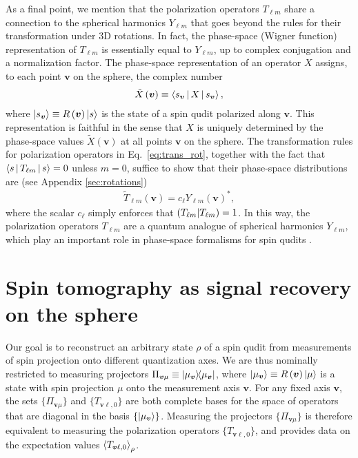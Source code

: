 \documentclass[notitlepage,twocolumn]{revtex4-2}
\newcommand{\p}[1]{\left(#1\right)} %
\newcommand{\bk}{\Braket} %
\renewcommand{\v}{\bm} %
\renewcommand{\set}[1]{\{#1\}} %
\def\obk#1{\mathinner{({#1})}}
\begin{document}
As a final point, we mention that the polarization operators $T_{\ell m}$ share a connection to the spherical harmonics $Y_{\ell m}$ that goes beyond the rules for their transformation under 3D rotations.
In fact, the phase-space (Wigner function) representation of $T_{\ell m}$ is essentially equal to $Y_{\ell m}$, up to complex conjugation and a normalization factor.
The phase-space representation of an operator $X$ assigns, to each point $\v v$ on the sphere, the complex number
\begin{align}
  \tilde X\p{\v v} \equiv \bk{s_{\v v}|X|s_{\v v}},
\end{align}
where $\ket{s_{\v v}}\equiv R\p{\v v}\ket{s}$ is the state of a spin qudit polarized along $\v v$.
This representation is faithful in the sense that $X$ is uniquely determined by the phase-space values $\tilde X\p{\v v}$ at all points $\v v$ on the sphere.
The transformation rules for polarization operators in Eq.~\eqref{eq:trans_rot}, together with the fact that $\bk{s|T_{\ell m}|s}=0$ unless $m=0$, suffice to show that their phase-space distributions are (see Appendix \ref{sec:rotations})
\begin{align}
  \tilde T_{\ell m}\p{\v v} = c_\ell Y_{\ell m}\p{\v v}^*,
\end{align}
where the scalar $c_\ell$ simply enforces that $\obk{T_{\ell m}|T_{\ell m}}=1$.
In this way, the polarization operators $T_{\ell m}$ are a quantum analogue of spherical harmonics $Y_{\ell m}$, which play an important role in phase-space formalisms for spin qudits \cite{li2013weylwignermoyal}.

\section{Spin tomography as signal recovery on the sphere}
\label{sec:signal_recovery}


Our goal is to reconstruct an arbitrary state $\rho$ of a spin qudit from measurements of spin projection onto different quantization axes.
We are thus nominally restricted to measuring projectors $\Pi_{\v v\mu} \equiv \op{\mu_{\v v}}$, where $\ket{\mu_{\v v}}\equiv R\p{\v v}\ket{\mu}$ is a state with spin projection $\mu$ onto the measurement axis $\v v$.
For any fixed axis $\v v$, the sets $\set{\Pi_{\v v\mu}}$ and $\set{T_{\v v\ell,0}}$ are both complete bases for the space of operators that are diagonal in the basis $\set{\ket{\mu_{\v v}}}$.
Measuring the projectors $\set{\Pi_{\v v\mu}}$ is therefore equivalent to measuring the polarization operators $\set{T_{\v v\ell,0}}$, and provides data on the expectation values $\bk{T_{\v v\ell,0}}_\rho$.
\end{document}
